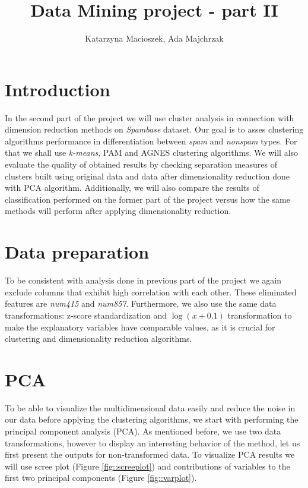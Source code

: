 \documentclass{article}
\author{Katarzyna Macioszek, Ada Majchrzak}
\title{Data Mining project - part II}
\begin{document}
	\maketitle
	
	\section{Introduction}
	In the second part of the project we will use cluster analysis in connection with dimension reduction methods on \textit{Spambase} dataset. Our goal is to asses clustering algorithms performance in differentiation between \textit{spam} and \textit{nonspam} types. For that we shall use \textit{k-means}, PAM and AGNES clustering algorithms. We will also evaluate the quality of obtained results by checking separation measures of clusters built using original data and data after dimensionality reduction done with PCA algorithm. Additionally, we will also compare the results of classification performed on the former part of the project versus how the same methods will perform after applying dimensionality reduction.
	
	\section{Data preparation}
	To be consistent with analysis done in previous part of the project we again exclude columns that exhibit high correlation with each other. These eliminated features are \textit{num415} and \textit{num857}. Furthermore, we also use the same data transformations: z-score standardization and $\log(x+0.1)$ transformation to make the explanatory variables have comparable values, as it is crucial for clustering and dimensionality reduction algorithms.
	
	\section{PCA}
	To be able to visualize the multidimensional data easily and reduce the noise in our data before applying the clustering algorithms, we start with performing the principal component analysis (PCA). As mentioned before, we use two data transformations, however to display an interesting behavior of the method, let us first present the outputs for non-transformed data. To visualize PCA results we will use scree plot (Figure \ref{fig::screeplot}) and contributions of variables to the first two principal components (Figure \ref{fig::varplot}).
	
\end{document}
